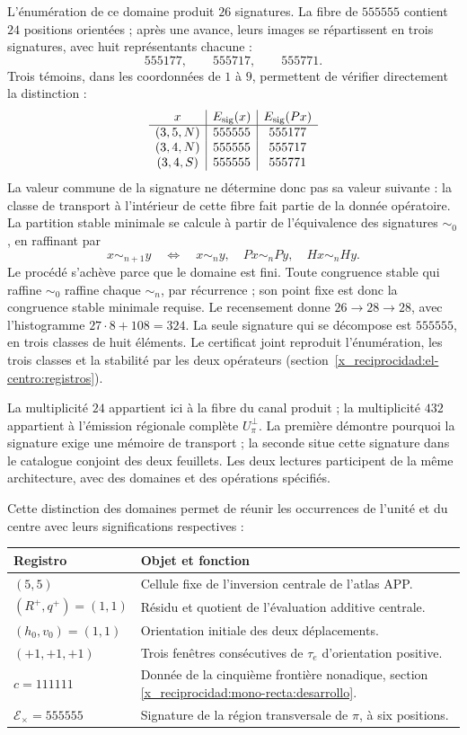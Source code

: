 L'énumération de ce domaine produit \(26\) signatures. La fibre de
\(555555\) contient \(24\) positions orientées ; après une
avance, leurs images se répartissent en trois signatures, avec huit
représentants chacune :
\[
 555177,\qquad555717,\qquad555771.
\]
Trois témoins, dans les coordonnées de \(1\) à \(9\), permettent de vérifier
directement la distinction :
\[
\begin{array}{c|c|c}
x&E_{\rm sig}(x)&E_{\rm sig}(Px)\\\hline
(3,5,N)&555555&555177\\
(3,4,N)&555555&555717\\
(3,4,S)&555555&555771
\end{array}
\]
La valeur commune de la signature ne détermine donc pas sa valeur suivante :
la classe de transport à l'intérieur de cette fibre fait partie de la donnée
opératoire. La partition stable minimale se calcule à partir de
l'équivalence des signatures \(\sim_0\), en raffinant par
\[
 x\sim_{n+1}y\quad\Longleftrightarrow\quad
 x\sim_n y,\quad Px\sim_n Py,\quad Hx\sim_n Hy.
\]
Le procédé s’achève parce que le domaine est fini. Toute congruence
stable qui raffine \(\sim_0\) raffine chaque \(\sim_n\), par récurrence ;
son point fixe est donc la congruence stable minimale requise.
Le recensement donne \(26\to28\to28\), avec l’histogramme
\(27\cdot8+108=324\). La seule signature qui se décompose est
\(555555\), en trois classes de huit éléments. Le certificat joint
reproduit l’énumération, les trois classes et la stabilité par les deux
opérateurs (section~\ref{x_reciprocidad:el-centro:registros}).

La multiplicité \(24\) appartient ici à la fibre du canal produit ;
la multiplicité \(432\) appartient à l'émission régionale complète
\(U_\pi^\perp\). La première démontre pourquoi la signature exige une mémoire
de transport ; la seconde situe cette signature dans le catalogue conjoint
des deux feuillets. Les deux lectures participent de la même architecture,
avec des domaines et des opérations spécifiés.

Cette distinction des domaines permet de réunir les occurrences de l'unité
et du centre avec leurs significations respectives :
\begin{center}
\small
\begin{tabularx}{\textwidth}{@{}lX@{}}
\toprule
Registro & Objet et fonction \\
\midrule
\((5,5)\) & Cellule fixe de l'inversion centrale de l'atlas APP.\\
\((R^+,q^+)=(1,1)\) & Résidu et quotient de l'évaluation additive centrale.\\
\((h_0,v_0)=(1,1)\) & Orientation initiale des deux déplacements.\\
\((+1,+1,+1)\) & Trois fenêtres consécutives de \(\tau_e\) d'orientation positive.\\
\(c=111111\) & Donnée de la cinquième frontière nonadique, section \ref{x_reciprocidad:mono-recta:desarrollo}.\\
\(\mathcal E_\times=555555\) & Signature de la région transversale de \(\pi\), à six positions.\\
\bottomrule
\end{tabularx}
\end{center}

